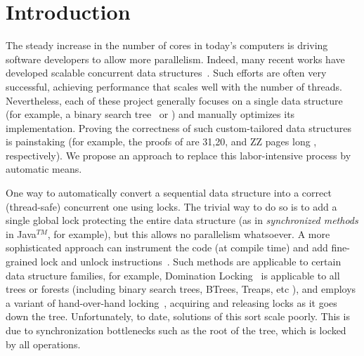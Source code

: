 \section{Introduction} \label{sec:intro}

The steady increase in the number of  cores in today's computers is driving software developers to allow more parallelism. 
Indeed, many recent works have developed scalable concurrent data
structures~\cite{ArbelA2014,DrachslerVY2014,NatarajanM2014,BrownER2014,CrainGR2013,BraginskyP2012,
AfekKKMT2012,EllenFRB2010,BronsonCCO2010,HerlihyLLS2007}.
Such efforts are often very successful, achieving performance that scales well
with the number of threads. 
Nevertheless, each of these project generally focuses on a single data structure 
(for example, a binary search tree~\cite{citrus} or ) and manually optimizes its implementation. 
Proving the correctness of such custom-tailored data structures is painstaking 
(for example, the proofs of \cite{BraginskyP2012,EllenFRB2010,z} are 31,20, and
ZZ pages long , respectively).
We propose an approach to replace this labor-intensive process by automatic means.

One way to automatically convert a sequential data structure into a correct (thread-safe) concurrent one using locks. 
The trivial way to do so is to add a single global lock protecting the entire data structure 
(as in \emph{synchronized methods} in Java$^{TM}$, for example), but this allows no parallelism whatsoever. 
A more sophisticated approach can instrument the code (at compile time) and add
fine-grained lock and unlock instructions~\cite{Gueta2011,SilberschatzK1980,dag,etc}. Such
methods are applicable to certain data structure families, for example,
Domination Locking~\cite{Gueta2011} is applicable to all trees or forests  
(including binary search trees, BTrees, Treaps, etc ), 
and employs a variant of hand-over-hand locking~\cite{SilberschatzK1980}, 
acquiring and releasing locks as it goes down the tree.  
Unfortunately, to date, solutions of this sort scale poorly. 
This is due to synchronization bottlenecks such as the root of the tree, 
which is locked by all operations.

